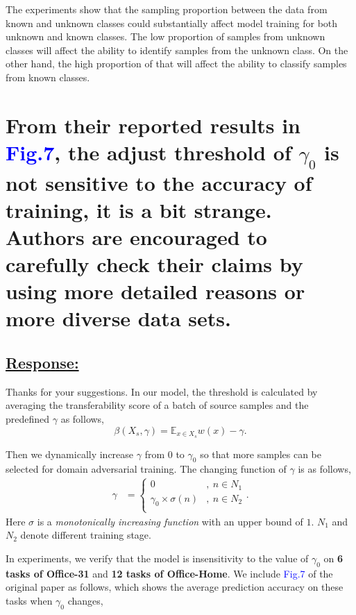 The experiments show that the sampling proportion between the data from known and unknown classes could substantially affect model training for both unknown and known classes.
The low proportion of samples from unknown classes will affect the ability to identify samples from the unknown class.
On the other hand, the high proportion of that will affect the ability to classify samples from known classes.

\section{From their reported results in \textcolor{blue}{Fig.7}, the adjust threshold of $\gamma_0$ is not sensitive to the accuracy of training, it is a bit strange.  
Authors are encouraged to carefully check their claims by using more detailed reasons or more diverse data sets. }
\label{Question: threshold}
\subsection*{\underline{\textbf{Response:}}}

Thanks for your suggestions.
In our model, the threshold is calculated by averaging the transferability score of a batch of source samples and the predefined $\gamma$ as follows,
\begin{equation}
    \label{eq: transferability thresholded}
    \beta(X_s, \gamma) = \mathbb{E}_{x \in X_s} w(x) - \gamma.
\end{equation}

Then we dynamically increase $\gamma$ from $0$ to $\gamma_0$ so that more samples can be selected for domain adversarial training.
The changing function of $\gamma$ is as follows,
\begin{equation}
    \label{eq: dynamic tolerable range}
    \begin{split}
        \gamma &=
        \begin{cases}
            0 & ,\: n \in N_1 \\
            \gamma_0 \times  \sigma(n) & ,\: n\in N_2 \\
        \end{cases}.
    \end{split}
\end{equation}
Here $\sigma$ is a \textit{monotonically increasing function} with an upper bound of $1$.
$N_1$ and $N_2$ denote different training stage.

In experiments, we verify that the model is insensitivity to the value of $\gamma_0$ on \textbf{6 tasks of Office-31} and \textbf{12 tasks of Office-Home}.
We include \textcolor{blue}{Fig.7} of the original paper as follows, which shows the average prediction accuracy on these tasks when $\gamma_0$ changes,


